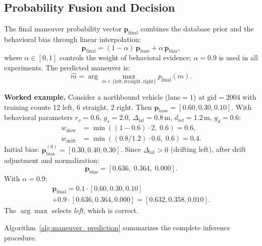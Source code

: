 \documentclass[conference]{IEEEtran}
\begin{document}
\subsection{Probability Fusion and Decision}
The final maneuver probability vector $\mathbf{p}_{\mathrm{final}}$ combines the database prior and the behavioral bias through linear interpolation:
\begin{equation}
  \mathbf{p}_{\mathrm{final}} = (1 - \alpha)\,\mathbf{p}_{\mathrm{base}} + \alpha\,\mathbf{p}_{\mathrm{bias}},
  \label{eq:fusion}
\end{equation}
where $\alpha \in [0, 1]$ controls the weight of behavioral evidence; $\alpha = 0.9$ is used in all experiments.
The predicted maneuver is:
\begin{equation}
  \hat{m} = \arg\max_{m \in \{\mathrm{left}, \mathrm{straight}, \mathrm{right}\}} p_{\mathrm{final}}(m).
\end{equation}

\textbf{Worked example.}
Consider a northbound vehicle ($\mathrm{lane} = 1$) at $\mathrm{gid} = 2004$ with training counts 12 left, 6 straight, 2 right.
Then $\mathbf{p}_{\mathrm{base}} = [0.60, 0.30, 0.10]$.
With behavioral parameters $r_v = 0.6$, $g_s = 2.0$, $\Delta_{\mathrm{lat}} = 0.8$\,m, $d_{\mathrm{ref}} = 1.2$\,m, $g_d = 0.6$:
\begin{align}
  w_{\mathrm{slow}} &= \min((1-0.6)\cdot 2,\; 0.6) = 0.6, \\
  w_{\mathrm{drift}} &= \min((0.8/1.2)\cdot 0.6,\; 0.6) = 0.4.
\end{align}
Initial bias: $\mathbf{p}_{\mathrm{bias}}^{(0)} = [0.30, 0.40, 0.30]$.
Since $\Delta_{\mathrm{lat}} > 0$ (drifting left), after drift adjustment and normalization:
\begin{equation}
  \mathbf{p}_{\mathrm{bias}} = [0.636,\; 0.364,\; 0.000].
\end{equation}
With $\alpha = 0.9$:
\begin{multline}
  \mathbf{p}_{\mathrm{final}} = 0.1{\cdot}[0.60, 0.30, 0.10] \\
  + 0.9{\cdot}[0.636, 0.364, 0.000] = [0.632, 0.358, 0.010].
\end{multline}
The $\arg\max$ selects \textit{left}, which is correct.

Algorithm~\ref{alg:maneuver_prediction} summarizes the complete inference procedure.
\end{document}
